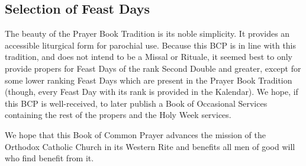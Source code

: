 \subsection{Selection of Feast Days}\par\noindent
The beauty of the Prayer Book Tradition is its noble simplicity. It provides an accessible liturgical form for parochial use. Because this BCP is in line with this tradition, and does not intend to be a Missal or Rituale, it seemed best to only provide propers for Feast Days of the rank Second Double and greater, except for some lower ranking Feast Days which are present in the Prayer Book Tradition (though, every Feast Day with its rank is provided in the Kalendar). We hope, if this BCP is well-received, to later publish a Book of Occasional Services containing the rest of the propers and the Holy Week services.

We hope that this Book of Common Prayer advances the mission of the Orthodox Catholic Church in its Western Rite and benefits all men of good will who find benefit from it.